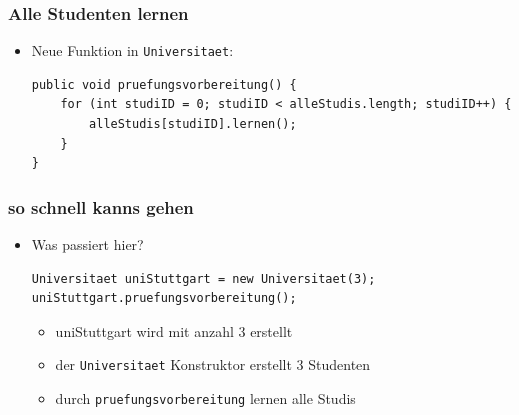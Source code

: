 \documentclass{../../presentation}
\begin{document}
\begin{frame}[fragile]
	\frametitle{Alle Studenten lernen}

	\begin{itemize}
		\item<2-> Neue Funktion in \texttt{Universitaet}:
		      \begin{verbatim}
public void pruefungsvorbereitung() {
	for (int studiID = 0; studiID < alleStudis.length; studiID++) {
		alleStudis[studiID].lernen();
	}
}
\end{verbatim}
	\end{itemize}
\end{frame}
\begin{frame}[fragile]
	\frametitle{so schnell kanns gehen}

	\begin{itemize}
		\item<2-> Was passiert hier?
		      \begin{verbatim}
Universitaet uniStuttgart = new Universitaet(3);
uniStuttgart.pruefungsvorbereitung();
\end{verbatim}
		      \begin{itemize}
			      \item<3->[\textbullet]uniStuttgart wird mit anzahl 3 erstellt
			      \item<4->[\textbullet]der \texttt{Universitaet} Konstruktor erstellt 3 Studenten
			      \item<5->[\textbullet]durch \texttt{pruefungsvorbereitung} lernen alle Studis
		      \end{itemize}
	\end{itemize}
\end{frame}

\renewcommand{\feedbackurl}{\vkFeedbackUrlDayFour}

\end{document}

